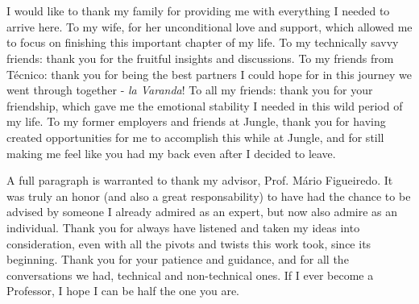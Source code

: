 \section*{\acknowledgments}


I would like to thank my family for providing me with everything I needed to
arrive here. To my wife, for her unconditional love and support, which allowed me
to focus on finishing this important chapter of my life. To my technically savvy
friends: thank you for the fruitful insights and discussions. To my friends
from Técnico: thank you for being the best partners I could hope for in this journey
we went through together - \emph{la Varanda}! To all my friends: thank you for
your friendship, which gave me the emotional stability I needed in this wild
period of my life. To my former employers and friends at Jungle, thank you
for having created opportunities for me to accomplish this while at Jungle, and
for still making me feel like you had my back even after I decided to leave.

A full paragraph is warranted to thank my advisor, Prof. Mário Figueiredo.
It was truly an honor (and also a great responsability) to have had the chance
to be advised by someone I already admired as an expert, but now also admire as
an individual. Thank you for always have listened and taken my ideas into consideration,
even with all the pivots and twists this work took, since its beginning. Thank you for
your patience and guidance, and for all the conversations we had, technical and
non-technical ones. If I ever become a Professor, I hope I can be half the one
you are.

